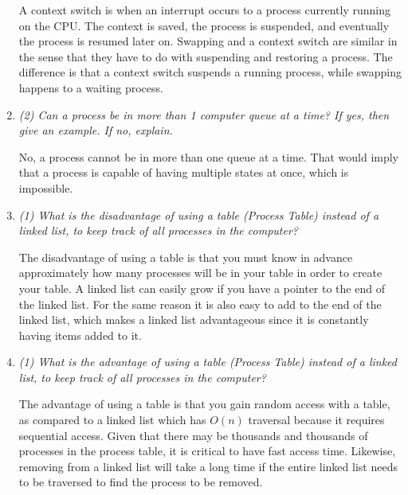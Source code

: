 \documentclass[letterpaper,11pt]{article}
\begin{document}
\begin{enumerate}
  A context switch is when an interrupt occurs to a process currently running on the CPU.  The context is saved, the process is suspended, and eventually the process is resumed later on.  Swapping and a context switch are similar in the sense that they have to do with suspending and restoring a process.  The difference is that a context switch suspends a running process, while swapping happens to a waiting process.
  \item \emph{(2) Can a process be in more than 1 computer queue at a time? If yes, then give an example. If no, explain.}

  No, a process cannot be in more than one queue at a time.  That would imply that a process is capable of having multiple states at once, which is impossible.
  \item \emph{(1) What is the disadvantage of using a table (Process Table) instead of a linked list, to keep track of all processes in the computer?}

  The disadvantage of using a table is that you must know in advance approximately how many processes will be in your table in order to create your table.  A linked list can easily grow if you have a pointer to the end of the linked list.  For the same reason it is also easy to add to the end of the linked list, which makes a linked list advantageous since it is constantly having items added to it.
  \item \emph{(1) What is the advantage of using a table (Process Table) instead of a linked list, to keep track of all processes in the computer?}

  The advantage of using a table is that you gain random access with a table, as compared to a linked list which has $O(n)$ traversal because it requires sequential access.  Given that there may be thousands and thousands of processes in the process table, it is critical to have fast access time.  Likewise, removing from a linked list will take a long time if the entire linked list needs to be traversed to find the process to be removed.
\end{enumerate}
\end{document}
